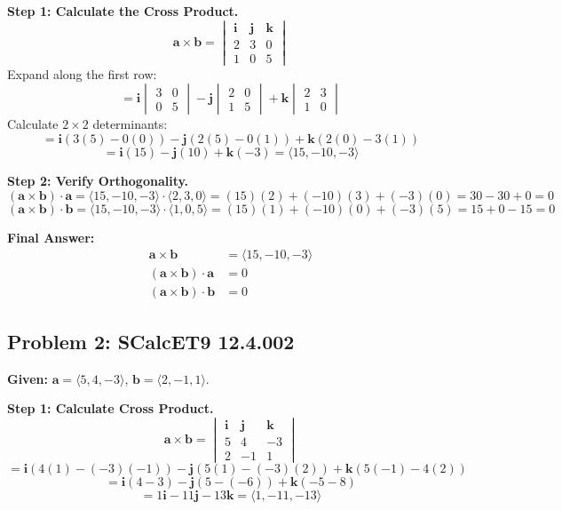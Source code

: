 \documentclass[11pt]{article}
\renewcommand{\vec}[1]{\mathbf{#1}}
\newcommand{\ihat}{\mathbf{i}}
\newcommand{\jhat}{\mathbf{j}}
\newcommand{\khat}{\mathbf{k}}
\begin{document}
\textbf{Step 1: Calculate the Cross Product.}
\[
\vec{a} \times \vec{b} = \begin{vmatrix} \ihat & \jhat & \khat \\ 2 & 3 & 0 \\ 1 & 0 & 5 \end{vmatrix}
\]
Expand along the first row:
\[
= \ihat \begin{vmatrix} 3 & 0 \\ 0 & 5 \end{vmatrix} - \jhat \begin{vmatrix} 2 & 0 \\ 1 & 5 \end{vmatrix} + \khat \begin{vmatrix} 2 & 3 \\ 1 & 0 \end{vmatrix}
\]
Calculate $2 \times 2$ determinants:
\[
= \ihat (3(5) - 0(0)) - \jhat (2(5) - 0(1)) + \khat (2(0) - 3(1))
\]
\[
= \ihat (15) - \jhat (10) + \khat (-3) = \langle 15, -10, -3 \rangle
\]

\textbf{Step 2: Verify Orthogonality.}
\[
(\vec{a} \times \vec{b}) \cdot \vec{a} = \langle 15, -10, -3 \rangle \cdot \langle 2, 3, 0 \rangle = (15)(2) + (-10)(3) + (-3)(0) = 30 - 30 + 0 = 0
\]
\[
(\vec{a} \times \vec{b}) \cdot \vec{b} = \langle 15, -10, -3 \rangle \cdot \langle 1, 0, 5 \rangle = (15)(1) + (-10)(0) + (-3)(5) = 15 + 0 - 15 = 0
\]

\textbf{Final Answer:}
\begin{align*}
\vec{a} \times \vec{b} &= \langle 15, -10, -3 \rangle \\
(\vec{a} \times \vec{b}) \cdot \vec{a} &= 0 \\
(\vec{a} \times \vec{b}) \cdot \vec{b} &= 0
\end{align*}

\hrulefill

\subsection*{Problem 2: SCalcET9 12.4.002}
\textbf{Given:} $\vec{a} = \langle 5, 4, -3 \rangle$, $\vec{b} = \langle 2, -1, 1 \rangle$.

\textbf{Step 1: Calculate Cross Product.}
\[
\vec{a} \times \vec{b} = \begin{vmatrix} \ihat & \jhat & \khat \\ 5 & 4 & -3 \\ 2 & -1 & 1 \end{vmatrix}
\]
\[
= \ihat (4(1) - (-3)(-1)) - \jhat (5(1) - (-3)(2)) + \khat (5(-1) - 4(2))
\]
\[
= \ihat (4 - 3) - \jhat (5 - (-6)) + \khat (-5 - 8)
\]
\[
= 1\ihat - 11\jhat - 13\khat = \langle 1, -11, -13 \rangle
\]
\end{document}
